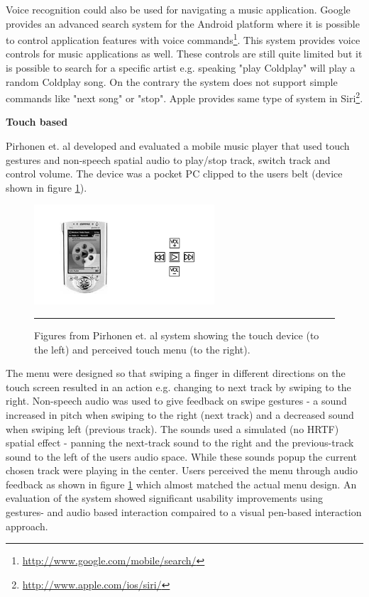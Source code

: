 Voice recognition could also be used for navigating a music application. Google provides an advanced search system for the Android platform where it is possible to control application features with voice commands\footnote{\url{http://www.google.com/mobile/search/}}. This system provides voice controls for music applications as well. These controls are still quite limited but it is possible to search for a specific artist e.g. speaking "play Coldplay" will play a random Coldplay song. On the contrary the system does not support simple commands like "next song" or "stop". Apple provides same type of system in Siri\footnote{\url{http://www.apple.com/ios/siri/}}.

\textbf{Touch based}

Pirhonen et. al \cite{pirhonen_gestural_2002} developed and evaluated a mobile music player that used touch gestures and non-speech spatial audio to play/stop track, switch track and control volume. The device was a pocket PC clipped to the users belt (device shown in figure \ref{fig:pirhonen}).

\begin{figure}[t]
	\centering
		\includegraphics[width=0.6\textwidth,height=\textheight,keepaspectratio]{./Figures/pirhonen-system.png}
		\rule{35em}{0.5pt}
	\caption[Pirhonen system]{Figures from Pirhonen et. al \cite{pirhonen_gestural_2002} system showing the touch device (to the left) and perceived touch menu (to the right).}
	\label{fig:pirhonen}
\end{figure}

The menu were designed so that swiping a finger in different directions on the touch screen resulted in an action e.g. changing to next track by swiping to the right. Non-speech audio was used to give feedback on swipe gestures - a sound increased in pitch when swiping to the right (next track) and a decreased sound when swiping left (previous track). The sounds used a simulated (no HRTF) spatial effect - panning the next-track sound to the right and the previous-track sound to the left of the users audio space. While these sounds popup the current chosen track were playing in the center. Users perceived the menu through audio feedback as shown in figure \ref{fig:pirhonen} which almost matched the actual menu design. An evaluation of the system showed significant usability improvements using gestures- and audio based interaction compaired to a visual pen-based interaction approach.

